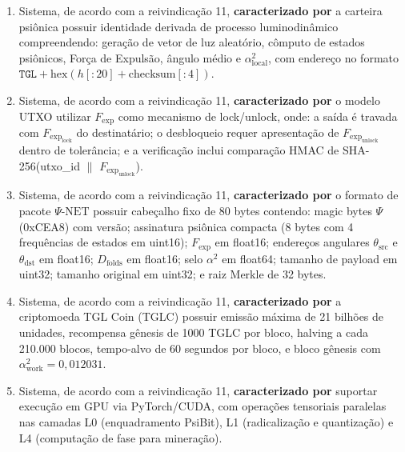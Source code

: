 \documentclass[12pt,a4paper]{article}
\newcommand{\alphaii}{\alpha^2}
\newcommand{\Dfolds}{D_{\text{folds}}}
\newcommand{\Fexp}{F_{\text{exp}}}
\newcommand{\PsiBit}{\textsc{PsiBit}}
\newcommand{\PsiNet}{\Psi\text{-NET}}
\begin{document}
\begin{enumerate}
\begin{enumerate}[label=(\alph*)]
  \textbf{caracterizado por} o sistema integrar em pilha
  unificada os métodos ACOM (BR 10 2025 026951 1), ACOM Mirror
  e ACOM Mirror Crypto do mesmo inventor, acrescidos de
  \PsiBit{} como unidade de enlace, endereçamento angular como
  protocolo de rede, e Prova de Fase como mecanismo de
  consenso.
  \end{enumerate}


\item Sistema, de acordo com a reivindicação 11,
\textbf{caracterizado por} a carteira psiônica possuir
identidade derivada de processo luminodinâmico compreendendo:
geração de vetor de luz aleatório, cômputo de estados
psiônicos, Força de Expulsão, ângulo médio e
$\alphaii_{\text{local}}$, com endereço no formato
$\texttt{TGL} + \text{hex}(h[:20] + \text{checksum}[:4])$.

\item Sistema, de acordo com a reivindicação 11,
\textbf{caracterizado por} o modelo UTXO utilizar $\Fexp$ como
mecanismo de lock/unlock, onde: a saída é travada com
$\Fexp_{\text{lock}}$ do destinatário; o desbloqueio requer
apresentação de $\Fexp_{\text{unlock}}$ dentro de tolerância;
e a verificação inclui comparação HMAC de
SHA-256(utxo\_id $\|$ $\Fexp_{\text{unlock}}$).

\item Sistema, de acordo com a reivindicação 11,
\textbf{caracterizado por} o formato de pacote $\PsiNet$
possuir cabeçalho fixo de 80 bytes contendo: magic bytes
$\Psi$ (0xCEA8) com versão; assinatura psiônica compacta
(8 bytes com 4 frequências de estados em uint16); $\Fexp$ em
float16; endereços angulares $\theta_{\text{src}}$ e
$\theta_{\text{dst}}$ em float16; $\Dfolds$ em float16; selo
$\alphaii$ em float64; tamanho de payload em uint32; tamanho
original em uint32; e raiz Merkle de 32 bytes.

\item Sistema, de acordo com a reivindicação 11,
\textbf{caracterizado por} a criptomoeda TGL Coin (TGLC) possuir
emissão máxima de 21 bilhões de unidades, recompensa gênesis de
1000 TGLC por bloco, halving a cada 210.000 blocos, tempo-alvo
de 60 segundos por bloco, e bloco gênesis com
$\alphaii_{\text{work}} = 0{,}012031$.

\item Sistema, de acordo com a reivindicação 11,
\textbf{caracterizado por} suportar execução em GPU via
PyTorch/CUDA, com operações tensoriais paralelas nas
camadas L0 (enquadramento PsiBit), L1 (radicalização e
quantização) e L4 (computação de fase para mineração).

\end{enumerate}
\end{document}
